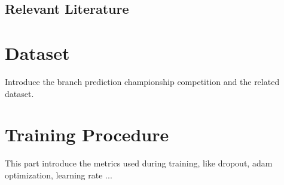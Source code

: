 \subsection{Relevant Literature}
\label{sec:rl_bp}

\section{Dataset}
\label{sec:dataset}
Introduce the branch prediction championship competition and the related dataset.

\section{Training Procedure}
\label{training}
This part introduce the metrics used during training, like dropout, adam optimization, learning rate ...


